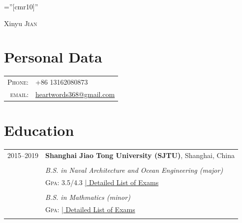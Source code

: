 \documentclass[a4paper,10pt]{article}
\begin{document}

\pagestyle{empty} %

\font\fb=''[cmr10]'' %

\par{\centering
		{\Huge Xinyu \textsc{Jian}
	}\bigskip\par}

\section{Personal Data}

\begin{tabular}{rl}
    \textsc{Phone:}     & +86 13162080873 \\
    \textsc{email:}     & \href{mailto:heartwords368@gmail.com}{heartwords368@gmail.com}
\end{tabular}


\section{Education}
\begin{tabular}{rl}	
  2015--2019 & \textbf{Shanghai Jiao Tong University (SJTU)}, Shanghai, China\\
  \\
 & \emph{B.S. in Naval Architecture and Ocean Engineering (major)}  \\
&\normalsize \textsc{Gpa}: 3.5/4.3 \hyperlink{grds}{\hfill | \footnotesize Detailed List of Exams}\\&\\
& \emph{B.S. in Mathmatics (minor)} \\
&\normalsize \textsc{Gpa}: \hyperlink{grds_cleli}{\hfill| \footnotesize Detailed List of Exams}\\&\\

\end{tabular}
\end{document}
